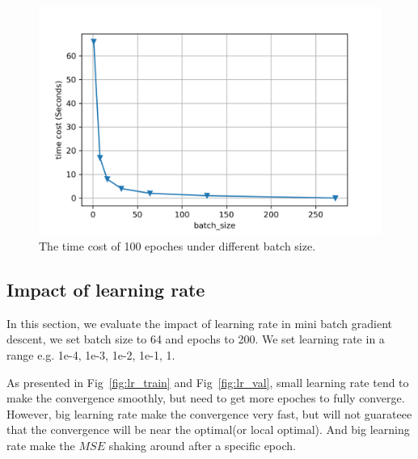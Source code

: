 \documentclass[journal, a4paper]{IEEEtran}
\begin{document}
\begin{figure}[!hbt]
	\begin{center}
		\includegraphics[width=\columnwidth]{time_cost}
		\caption{The time cost of 100 epoches under different batch size.}
		\label{fig:time_cost}
	\end{center}
\end{figure} 

\subsection{Impact of learning rate}
In this section, we evaluate the impact of learning rate in mini batch gradient descent, we set batch size to 64 and epochs to 200. We set learning rate in a range e.g. 1e-4, 1e-3, 1e-2, 1e-1, 1. \par
As presented in Fig~\ref{fig:lr_train} and Fig~\ref{fig:lr_val}, small learning rate tend to make the convergence smoothly, but need to get more epoches to fully converge. However, big learning rate make the convergence very fast, but will not guarateee that the convergence will be near the optimal(or local optimal). And big learning rate make the $MSE$ shaking around after a specific epoch.  \par
\end{document}
